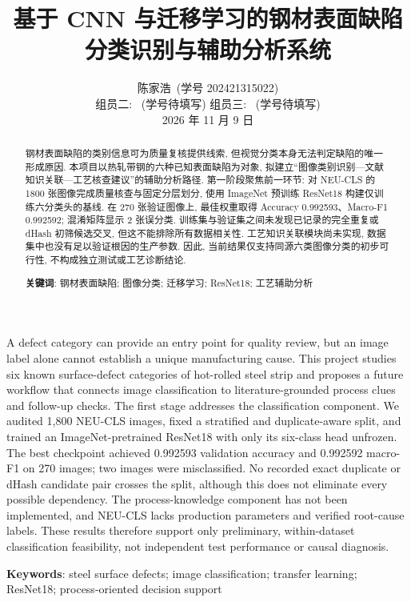 \documentclass[letterpaper, 10 pt, conference]{ieeeconf}
\title{\LARGE \bf
基于 CNN 与迁移学习的钢材表面缺陷分类识别与辅助分析系统
}
\author{陈家浩~(学号 202421315022) \\
组员二: \underline{\hspace{1.8cm}}~(学号待填写) \quad
组员三: \underline{\hspace{1.8cm}}~(学号待填写) \\
2026 年 11 月 9 日}
\begin{document}
\maketitle

\begin{abstract}
钢材表面缺陷的类别信息可为质量复核提供线索, 但视觉分类本身无法判定缺陷的唯一形成原因. 本项目以热轧带钢的六种已知表面缺陷为对象, 拟建立“图像类别识别—文献知识关联—工艺核查建议”的辅助分析路径. 第一阶段聚焦前一环节: 对 NEU-CLS 的 1800 张图像完成质量核查与固定分层划分, 使用 ImageNet 预训练 ResNet18 构建仅训练六分类头的基线. 在 270 张验证图像上, 最佳权重取得 Accuracy 0.992593、Macro-F1 0.992592; 混淆矩阵显示 2 张误分类. 训练集与验证集之间未发现已记录的完全重复或 dHash 初筛候选交叉, 但这不能排除所有数据相关性. 工艺知识关联模块尚未实现, 数据集中也没有足以验证根因的生产参数. 因此, 当前结果仅支持同源六类图像分类的初步可行性, 不构成独立测试或工艺诊断结论.

\vspace{1ex}\noindent\textbf{关键词}: 钢材表面缺陷; 图像分类; 迁移学习; ResNet18; 工艺辅助分析
\end{abstract}

\begin{eabstract}
A defect category can provide an entry point for quality review, but an image label alone cannot establish a unique manufacturing cause. This project studies six known surface-defect categories of hot-rolled steel strip and proposes a future workflow that connects image classification to literature-grounded process clues and follow-up checks. The first stage addresses the classification component. We audited 1,800 NEU-CLS images, fixed a stratified and duplicate-aware split, and trained an ImageNet-pretrained ResNet18 with only its six-class head unfrozen. The best checkpoint achieved 0.992593 validation accuracy and 0.992592 macro-F1 on 270 images; two images were misclassified. No recorded exact duplicate or dHash candidate pair crosses the split, although this does not eliminate every possible dependency. The process-knowledge component has not been implemented, and NEU-CLS lacks production parameters and verified root-cause labels. These results therefore support only preliminary, within-dataset classification feasibility, not independent test performance or causal diagnosis.

\vspace{1ex}\noindent\textbf{Keywords}: steel surface defects; image classification; transfer learning; ResNet18; process-oriented decision support
\end{eabstract}
\end{document}
